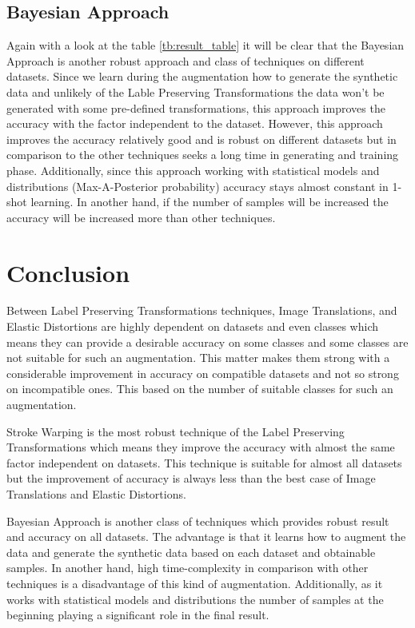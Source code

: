 \subsection{Bayesian Approach}
Again with a look at the table \ref{tb:result_table}  it will be clear that the Bayesian Approach is
another robust approach and class of techniques on different datasets. Since we learn during the
augmentation how to generate the synthetic data and unlikely of the Lable Preserving Transformations
the data won't be generated with some pre-defined transformations, this approach improves the
accuracy with the factor independent to the dataset. However, this approach improves the accuracy
relatively good and is robust on different datasets but in comparison to the other techniques seeks
a long time in generating and training phase. Additionally, since this approach working with
statistical models and distributions (Max-A-Posterior probability) accuracy stays almost constant in
1-shot learning. In another hand, if the number of samples will be increased the accuracy will be
increased more than other techniques.

\section{Conclusion}
Between Label Preserving Transformations techniques, Image Translations, and Elastic Distortions are highly dependent on datasets and even classes which means they can provide a desirable accuracy on some classes and some classes are not suitable for such an augmentation. This matter makes them strong with a considerable improvement in accuracy on compatible datasets and not so strong on incompatible ones. This based on the number of suitable classes for such an augmentation.

Stroke Warping is the most robust technique of the Label Preserving Transformations which means they improve the accuracy with almost the same factor independent on datasets. This technique is suitable for almost all datasets but the improvement of accuracy is always less than the best case of Image Translations and Elastic Distortions.

Bayesian Approach is another class of techniques which provides robust result and accuracy on all datasets. The advantage is that it learns how to augment the data and generate the synthetic data based on each dataset and obtainable samples. In another hand, high time-complexity in comparison with other techniques is a disadvantage of this kind of augmentation. Additionally, as it works with statistical models and distributions the number of samples at the beginning playing a significant role in the final result.

